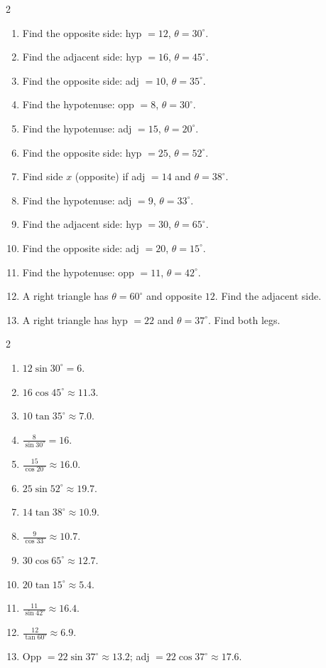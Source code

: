 \documentclass[11pt]{article}
\begin{document}
\begin{recapbox}
\begin{multicols}{2}
\small
\begin{enumerate}[leftmargin=*,itemsep=3pt]
  \item Find the opposite side: hyp $=12$, $\theta=30^\circ$.
  \item Find the adjacent side: hyp $=16$, $\theta=45^\circ$.
  \item Find the opposite side: adj $=10$, $\theta=35^\circ$.
  \item Find the hypotenuse: opp $=8$, $\theta=30^\circ$.
  \item Find the hypotenuse: adj $=15$, $\theta=20^\circ$.
  \item Find the opposite side: hyp $=25$, $\theta=52^\circ$.
  \item Find side $x$ (opposite) if adj $=14$ and $\theta=38^\circ$.
  \item Find the hypotenuse: adj $=9$, $\theta=33^\circ$.
  \item Find the adjacent side: hyp $=30$, $\theta=65^\circ$.
  \item Find the opposite side: adj $=20$, $\theta=15^\circ$.
  \item Find the hypotenuse: opp $=11$, $\theta=42^\circ$.
  \item A right triangle has $\theta=60^\circ$ and opposite $12$. Find the adjacent side.
  \item A right triangle has hyp $=22$ and $\theta=37^\circ$. Find both legs.
\end{enumerate}
\end{multicols}
\end{recapbox}

\begin{keybox}
\begin{multicols}{2}
\small
\begin{enumerate}[leftmargin=*,itemsep=3pt]
  \item $12\sin30^\circ=6$.
  \item $16\cos45^\circ\approx11.3$.
  \item $10\tan35^\circ\approx7.0$.
  \item $\tfrac{8}{\sin30^\circ}=16$.
  \item $\tfrac{15}{\cos20^\circ}\approx16.0$.
  \item $25\sin52^\circ\approx19.7$.
  \item $14\tan38^\circ\approx10.9$.
  \item $\tfrac{9}{\cos33^\circ}\approx10.7$.
  \item $30\cos65^\circ\approx12.7$.
  \item $20\tan15^\circ\approx5.4$.
  \item $\tfrac{11}{\sin42^\circ}\approx16.4$.
  \item $\tfrac{12}{\tan60^\circ}\approx6.9$.
  \item Opp $=22\sin37^\circ\approx13.2$; adj $=22\cos37^\circ\approx17.6$.
\end{enumerate}
\end{multicols}
\end{keybox}
\end{document}
